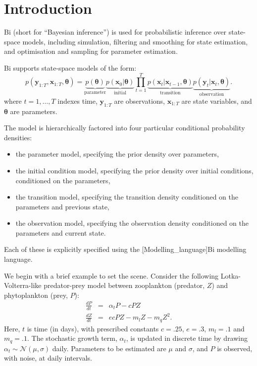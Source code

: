 \section{Introduction\label{Introduction}}

Bi (short for ``Bayesian inference'') is used for probabilistic inference over
state-space models, including simulation, filtering and smoothing for state
estimation, and optimisation and sampling for parameter estimation.

Bi supports state-space models of the form:
\begin{equation*}
p(\mathbf{y}_{1:T},\mathbf{x}_{1:T},\boldsymbol{\theta}) =
\underbrace{p(\boldsymbol{\theta})}_{\text{parameter}}
\underbrace{p(\mathbf{x}_0|\boldsymbol{\theta})}_{\text{initial}}
\prod_{t=1}^T
\underbrace{p(\mathbf{x}_t|\mathbf{x}_{t-1},\boldsymbol{\theta})}_{\text{transition}}
\underbrace{p(\mathbf{y}_t|\mathbf{x}_t,\boldsymbol{\theta})}_{\text{observation}}.
\end{equation*}
where $t = 1,\ldots,T$ indexes time, $\mathbf{y}_{1:T}$ are observations,
$\mathbf{x}_{1:T}$ are state variables, and $\boldsymbol{\theta}$ are
parameters.

The model is hierarchically factored into four particular conditional
probability densities:
\begin{itemize}
\item the parameter model, specifying the prior density over parameters,
\item the initial condition model, specifying the prior density over initial
  conditions, conditioned on the parameters,
\item the transition model, specifying the transition density conditioned on
  the parameters and previous state,
\item the observation model, specifying the observation density conditioned on
  the parameters and current state.
\end{itemize}
Each of these is explicitly specified using the
\hyperref[hyper][Modelling_language]{Bi modelling language}.

We begin with a brief example to set the scene. Consider the following
Lotka-Volterra-like predator-prey model between zooplankton (predator, $Z$)
and phytoplankton (prey, $P$):
\begin{eqnarray*}
\frac{dP}{dt} &=& \alpha_t P - cPZ\\
\frac{dZ}{dt} &=& ecPZ - m_lZ - m_q Z^2.
\end{eqnarray*}
Here, $t$ is time (in days), with prescribed constants $c = .25$, $e = .3$,
$m_l = .1$ and $m_q = .1$. The stochastic growth term, $\alpha_t$, is updated
in discrete time by drawing $\alpha_t \sim \mathcal{N}(\mu,\sigma)$
daily. Parameters to be estimated are $\mu$ and $\sigma$, and $P$ is observed,
with noise, at daily intervals.

